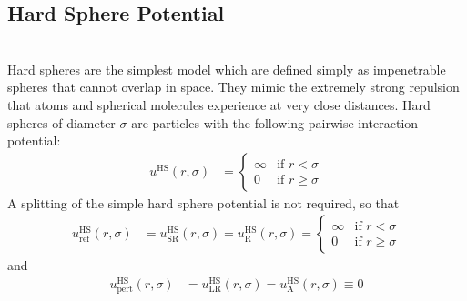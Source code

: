\newpage
\subsection{Hard Sphere Potential}
~\\

Hard spheres are the simplest model which are defined simply as impenetrable spheres that cannot overlap
in space. They mimic the extremely strong repulsion that atoms and spherical molecules
experience at very close distances.
Hard spheres of diameter $\sigma$ are particles with the following pairwise interaction potential:
\begin{align}
u^\text{HS}(r,\sigma) &=
\begin{cases}
\infty  & \mbox{if } r <    \sigma \\
0       & \mbox{if } r \geq \sigma
\end{cases}
\end{align}
A splitting of the simple hard sphere potential is not required, so that
\begin{align}
u^\text{HS}_\text{ref}(r,\sigma) &= u^\text{HS}_\text{SR}(r,\sigma) = u^\text{HS}_\text{R}(r,\sigma) =
\begin{cases}
\infty  & \mbox{if } r <    \sigma \\
0       & \mbox{if } r \geq \sigma
\end{cases}
\end{align}
and
\begin{align}
u^\text{HS}_\text{pert}(r,\sigma) &= u^\text{HS}_\text{LR}(r,\sigma) = u^\text{HS}_\text{A}(r,\sigma) \equiv 0
\end{align}

